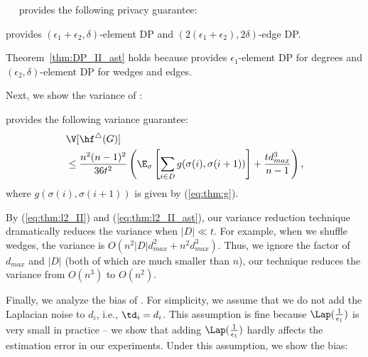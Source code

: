 \smallskip
{}~~\AlgWSTriVR{} provides the following privacy guarantee: 

\begin{theorem}
\label{thm:DP_II_ast}
\AlgWSTri{} provides $(\epsilon_1 + \epsilon_2, \delta)$-element DP and $(2(\epsilon_1 + \epsilon_2), 2\delta)$-edge DP. 
\end{theorem}

Theorem~\ref{thm:DP_II_ast} holds because \AlgWSTri{} provides $\epsilon_1$-element DP for degrees and $(\epsilon_2, \delta)$-element DP for wedges and edges. 

Next, we show the variance of \AlgWSTriVR{}:

\begin{theorem}
\label{thm:var_II_ast}
\AlgWSTriVR{} provides the following variance guarantee:
\begin{align}
& \V[\hf^\triangle(G)] \nonumber\\ 
& \leq \frac{n^2(n-1)^2}{36t^2} \left(\E_\sigma \left[ \sum_{i \in D} 
g(\sigma(i),\sigma(i+1)) \right] + \frac{t d_{max}^3}{n-1}\right), \label{eq:thm:l2_II_ast}
\end{align}
where $g(\sigma(i),\sigma(i+1))$ is given by (\ref{eq:thm:g}). 
\end{theorem}
By (\ref{eq:thm:l2_II}) and (\ref{eq:thm:l2_II_ast}), our variance reduction technique dramatically reduces the variance when $|D| \ll t$. 
For example, when we shuffle wedges, the variance is $O(n^2|D|d_{max}^2 + n^2 d_{max}^3)$. 
Thus, we ignore the factor of $d_{max}$ and $|D|$ (both of which are much smaller than $n$), our technique reduces the variance from $O(n^3)$ to $O(n^2)$. 

Finally, we analyze the bias of \AlgWSTriVR{}. 
For simplicity, we assume that we do not add the Laplacian noise to $d_i$, i.e., $\td_i = d_i$. 
This assumption is fine because 
$\Lap(\frac{1}{\epsilon_1})$ is very small in practice -- we show that adding $\Lap(\frac{1}{\epsilon_1})$ hardly affects the estimation error in our experiments. 
Under this assumption, we show the bias: 

